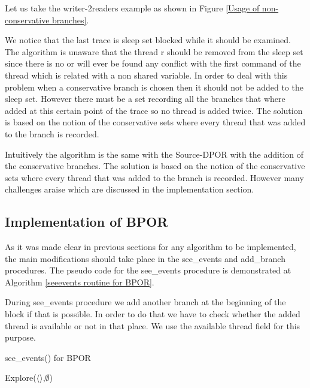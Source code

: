 Let us take the writer-2readers example as shown in Figure \ref{Usage of non-conservative branches}.


We notice that the last trace is sleep set blocked while it should be examined. The algorithm is unaware that the thread r should be removed from the sleep set since there is no
or will ever be found any conflict with the first command of the thread which is related with a non shared variable. In order to deal with this problem when a conservative
branch is chosen then it should not be added to the sleep set. However there must be a set recording all the branches that where added at this certain point of the trace
so no thread is added twice. The solution is based on the notion of the conservative sets where every thread that was added to the branch is recorded. 

Intuitively the algorithm is the same with the Source-DPOR with the addition of the conservative branches. The solution is based on the notion of the conservative sets where every thread that was added to the branch is recorded.  However many challenges araise which are discussed 
in the implementation section.


\subsection{Implementation of BPOR}
As it was made clear in previous sections for any algorithm to be implemented, the main modifications should take place in the see\_events and add\_branch procedures. 
The pseudo code for the see\_events procedure is demonstrated at Algorithm \ref{seeevents routine for BPOR}.

During see\_events procedure we add another branch at the beginning of the block if that is possible. In order to do that we have to check whether the added thread
is available or not in that place. We use the available thread field for this purpose.

\begin{algorithm}[H]
    \caption{see\_events() for BPOR}
    \label{seeevents routine for BPOR}
    Explore($\langle \rangle$,$\emptyset$)\;
\end{algorithm}

